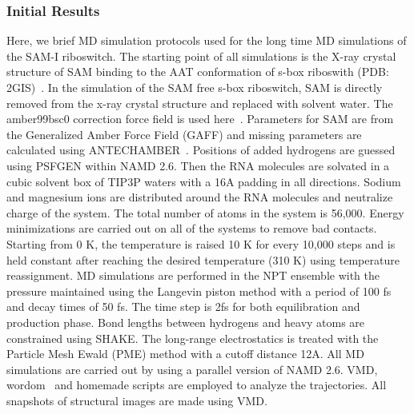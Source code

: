 \documentclass[a4paper,10pt]{article}
\begin{document}
\subsubsection*{Initial Results}

Here, we brief MD simulation protocols used for the long time MD simulations of the SAM-I riboswitch.  The starting point of all simulations is the X-ray crystal structure of SAM binding to the AAT conformation of s-box riboswith (PDB: 2GIS)~\cite{montange}. In the simulation of the SAM free s-box riboswitch, SAM is directly removed from the x-ray crystal structure and replaced with solvent water. The amber99bsc0 correction force field is used here~\cite{alberto}. Parameters for SAM are from the Generalized Amber Force Field (GAFF) and missing parameters are calculated using ANTECHAMBER~\cite{wang}. Positions of added hydrogens are guessed using PSFGEN within NAMD 2.6. Then the RNA molecules are solvated in a cubic solvent box of TIP3P waters with a 16A padding in all directions. Sodium and magnesium ions are distributed around the RNA molecules and neutralize charge of the system. The total number of atoms in the system is 56,000. Energy minimizations are carried out on all of the systems to remove bad contacts. Starting from 0 K, the temperature is raised 10 K for every 10,000 steps and is held constant after reaching the desired temperature (310 K) using temperature reassignment. MD simulations are performed in the NPT ensemble with the pressure maintained using the Langevin piston method with a period of 100 fs and decay times of 50 fs. The time step is 2fs for both equilibration and production phase. Bond lengths between hydrogens and heavy atoms are constrained using SHAKE. The long-range electrostatics is treated with the Particle Mesh Ewald (PME) method with a cutoff distance 12A.  All MD simulations are carried out by using a parallel version of NAMD 2.6.  VMD, wordom~\cite{moe} and homemade scripts are employed to analyze the trajectories. All snapshots of structural images are made using VMD.

\end{document}
